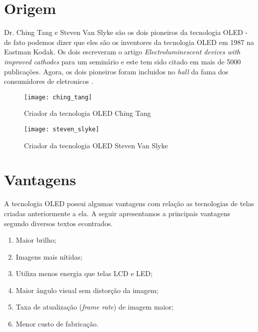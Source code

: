 \section{Origem}
\label{sec:camadas}

Dr. Ching Tang e Steven Van Slyke são os dois pioneiros da tecnologia OLED - de fato podemos dizer que eles são os inventores da tecnologia OLED em 1987 na Eastman Kodak. Os dois escreveram o artigo \textit{Electroluminescent devices with improved cathodes} para um seminário e este tem sido citado em mais de 5000 publicações. Agora, os dois pioneiros foram incluidos no \textit{hall} da fama dos consumidores de eletronicos \cite{OLEDPioneers}. 

\begin{figure}[!h]
  \centering
  \texttt{[image: ching\_tang]} 
  \caption{Criador da tecnologia OLED Ching Tang}
  \label{fig:ching_tang} 
\end{figure}

\begin{figure}[!h]
  \centering
  \texttt{[image: steven\_slyke]} 
  \caption{Criador da tecnologia OLED Steven Van Slyke}
  \label{fig:steven_slyke} 
\end{figure}


\section{Vantagens}
\label{sec:vantagens}

A tecnologia OLED possui algumas vantagens com relação as tecnologias de telas criadas anteriormente a ela. A seguir apresentamos a principais vantagens segundo diversos textos econtrados.

\begin{enumerate}
	\item Maior brilho;
	\item Imagens mais nítidas;
	\item Utiliza menos energia que telas LCD e LED;
	\item Maior ângulo visual sem distorção da imagem;
	\item Taxa de atualização (\textit{frame rate}) de imagem maior;
	\item Menor custo de fabricação.
\end{enumerate}

